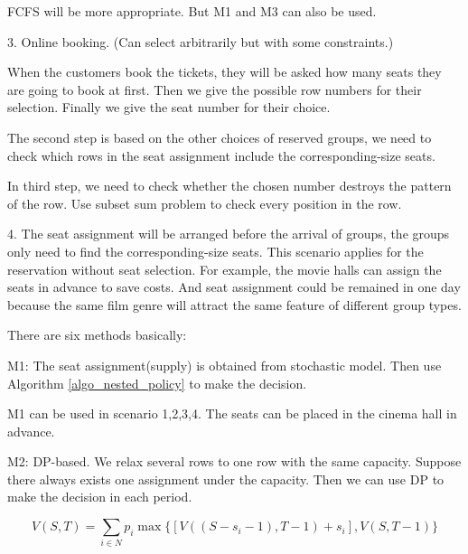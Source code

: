 FCFS will be more appropriate. But M1 and M3 can also be used.


3. Online booking. (Can select arbitrarily but with some constraints.)

When the customers book the tickets, they will be asked how many seats they are going to book at first. Then we give the possible row numbers for their selection. Finally we give the seat number for their choice.

The second step is based on the other choices of reserved groups, we need to check which rows in the seat assignment include the corresponding-size seats.

In third step, we need to check whether the chosen number destroys the pattern of the row. Use subset sum problem to check every position in the row.


4. The seat assignment will be arranged before the arrival of groups, the groups only need to find the corresponding-size seats. This scenario applies for the reservation without seat selection. For example, the movie halls can assign the seats in advance to save costs. And seat assignment could be remained in one day because the same film genre will attract the same feature of different group types.


There are six methods basically:

M1: The seat assignment(supply) is obtained from stochastic model. Then use Algorithm \ref{algo_nested_policy} to make the decision.

M1 can be used in scenario 1,2,3,4. The seats can be placed in the cinema hall in advance.

M2: DP-based. We relax several rows to one row with the same capacity. Suppose there always exists one assignment under the capacity. Then we can use DP to make the decision in each period.

$$V(S,T) = \sum_{i \in N} p_i \max\{ {[V((S-s_i-1),T-1)+ s_i]}, {V(S,T-1)}\}$$

